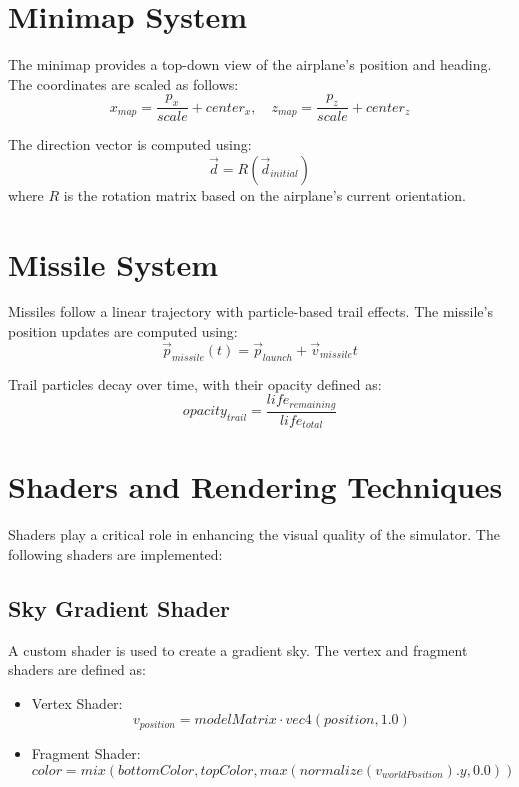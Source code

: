 \documentclass{article}
\begin{document}
\section{Minimap System}
The minimap provides a top-down view of the airplane's position and heading. The coordinates are scaled as follows:
\begin{equation}
x_{map} = \frac{p_x}{scale} + center_x, \quad z_{map} = \frac{p_z}{scale} + center_z
\end{equation}

The direction vector is computed using:
\begin{equation}
\vec{d} = R(\vec{d}_{initial})
\end{equation}
where $R$ is the rotation matrix based on the airplane's current orientation.

\section{Missile System}
Missiles follow a linear trajectory with particle-based trail effects. The missile's position updates are computed using:
\begin{equation}
\vec{p}_{missile}(t) = \vec{p}_{launch} + \vec{v}_{missile}t
\end{equation}

Trail particles decay over time, with their opacity defined as:
\begin{equation}
opacity_{trail} = \frac{life_{remaining}}{life_{total}}
\end{equation}

\section{Shaders and Rendering Techniques}
Shaders play a critical role in enhancing the visual quality of the simulator. The following shaders are implemented:

\subsection{Sky Gradient Shader}
A custom shader is used to create a gradient sky. The vertex and fragment shaders are defined as:
\begin{itemize}
\item Vertex Shader:
\begin{equation}
v_{position} = modelMatrix \cdot vec4(position, 1.0)
\end{equation}
\item Fragment Shader:
\begin{equation}
color = mix(bottomColor, topColor, max(normalize(v_{worldPosition}).y, 0.0))
\end{equation}
\end{itemize}
\end{document}
